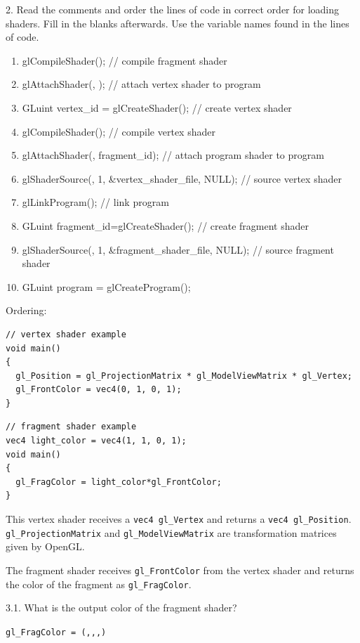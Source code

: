 \documentclass[12pt]{article}
\newcommand{\TODOL}[1]{\textcolor{red}{\underline{\hspace{#1 cm}}}}
\begin{document}
2. Read the comments and order the lines of code in correct order for loading
shaders.  Fill in the blanks afterwards. Use the variable names found in the lines of code.

\begin{enumerate}[label=\Alph*.]
\item glCompileShader(\TODOL2); // compile fragment shader
\item glAttachShader(\TODOL2, \TODOL2); // attach vertex shader to program
\item GLuint vertex\_id = glCreateShader(\TODOL2); // create vertex shader
\item glCompileShader(\TODOL2); // compile vertex shader
\item glAttachShader(\TODOL2, fragment\_id); // attach program shader to program
\item glShaderSource(\TODOL2, 1, \&vertex\_shader\_file, NULL); // source vertex shader
\item glLinkProgram(\TODOL2); // link program
\item GLuint fragment\_id=glCreateShader(\TODOL2); // create fragment shader
\item glShaderSource(\TODOL2, 1, \&fragment\_shader\_file, NULL); // source fragment shader
\item GLuint program = glCreateProgram();
\end{enumerate}
Ordering:\TODOL6

\begin{lstlisting}
// vertex shader example
void main()
{
  gl_Position = gl_ProjectionMatrix * gl_ModelViewMatrix * gl_Vertex;
  gl_FrontColor = vec4(0, 1, 0, 1);
}
\end{lstlisting}

\begin{lstlisting}
// fragment shader example
vec4 light_color = vec4(1, 1, 0, 1);
void main()
{
  gl_FragColor = light_color*gl_FrontColor;
}
\end{lstlisting}

This vertex shader receives a \texttt{vec4 gl\_Vertex} and returns a
\texttt{vec4 gl\_Position}. \texttt{gl\_ProjectionMatrix} and
\texttt{gl\_ModelViewMatrix} are transformation matrices given by OpenGL.

The fragment shader receives \texttt{gl\_FrontColor} from the vertex shader and
returns the color of the fragment as \texttt{gl\_FragColor}.

3.1. What is the output color of the fragment shader?

\texttt{gl\_FragColor = (\TODOL1,\TODOL1,\TODOL1,\TODOL1)}
\end{document}
